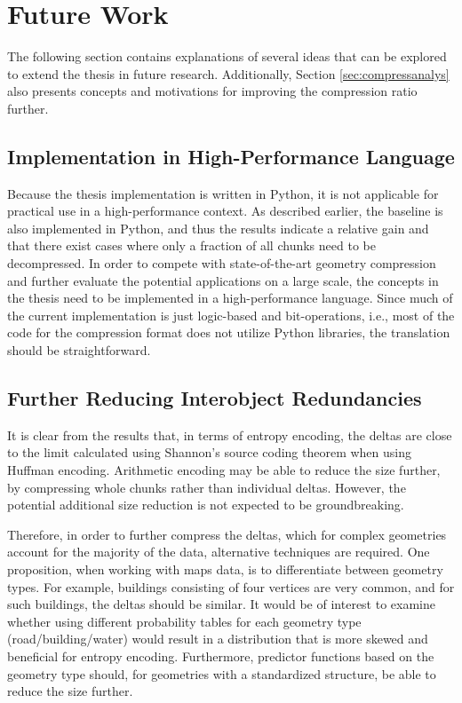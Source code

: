 \newpage
\section{Future Work}
The following section contains explanations of several ideas that can be explored to extend the thesis in future research. Additionally, Section \ref{sec:compressanalys} also presents concepts and motivations for improving the compression ratio further.
\subsection{Implementation in High-Performance Language}
Because the thesis implementation is written in Python, it is not applicable for practical use in a high-performance context. As described earlier, the baseline is also implemented in Python, and thus the results indicate a relative gain and that there exist cases where only a fraction of all chunks need to be decompressed. In order to compete with state-of-the-art geometry compression and further evaluate the potential applications on a large scale, the concepts in the thesis need to be implemented in a high-performance language. Since much of the current implementation is just logic-based and bit-operations, i.e., most of the code for the compression format does not utilize Python libraries, the translation should be straightforward.

\subsection{Further Reducing Interobject Redundancies}
It is clear from the results that, in terms of entropy encoding, the deltas are close to the limit calculated using Shannon's source coding theorem when using Huffman encoding. Arithmetic encoding may be able to reduce the size further, by compressing whole chunks rather than individual deltas.  However, the potential additional size reduction is not expected to be groundbreaking.

Therefore, in order to further compress the deltas, which for complex geometries account for the majority of the data, alternative techniques are required. One proposition, when working with maps data, is to differentiate between geometry types. For example, buildings consisting of four vertices are very common, and for such buildings, the deltas should be similar. It would be of interest to examine whether using different probability tables for each geometry type (road/building/water) would result in a distribution that is more skewed and beneficial for entropy encoding. Furthermore, predictor functions based on the geometry type should, for geometries with a standardized structure, be able to reduce the size further.

